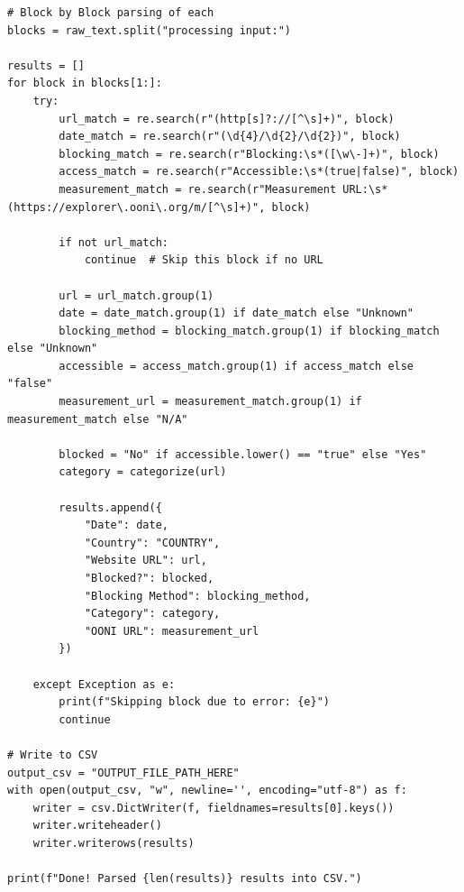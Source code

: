 \begin{lstlisting}[style=python, caption={Script for Categorizing and Parsing OONI Web Connectivity Test Output}]
# Block by Block parsing of each
blocks = raw_text.split("processing input:")

results = []
for block in blocks[1:]:
    try:
        url_match = re.search(r"(http[s]?://[^\s]+)", block)
        date_match = re.search(r"(\d{4}/\d{2}/\d{2})", block)
        blocking_match = re.search(r"Blocking:\s*([\w\-]+)", block)
        access_match = re.search(r"Accessible:\s*(true|false)", block)
        measurement_match = re.search(r"Measurement URL:\s*(https://explorer\.ooni\.org/m/[^\s]+)", block)

        if not url_match:
            continue  # Skip this block if no URL

        url = url_match.group(1)
        date = date_match.group(1) if date_match else "Unknown"
        blocking_method = blocking_match.group(1) if blocking_match else "Unknown"
        accessible = access_match.group(1) if access_match else "false"
        measurement_url = measurement_match.group(1) if measurement_match else "N/A"

        blocked = "No" if accessible.lower() == "true" else "Yes"
        category = categorize(url)

        results.append({
            "Date": date,
            "Country": "COUNTRY",
            "Website URL": url,
            "Blocked?": blocked,
            "Blocking Method": blocking_method,
            "Category": category,
            "OONI URL": measurement_url
        })

    except Exception as e:
        print(f"Skipping block due to error: {e}")
        continue

# Write to CSV
output_csv = "OUTPUT_FILE_PATH_HERE"
with open(output_csv, "w", newline='', encoding="utf-8") as f:
    writer = csv.DictWriter(f, fieldnames=results[0].keys())
    writer.writeheader()
    writer.writerows(results)

print(f"Done! Parsed {len(results)} results into CSV.")
\end{lstlisting}








